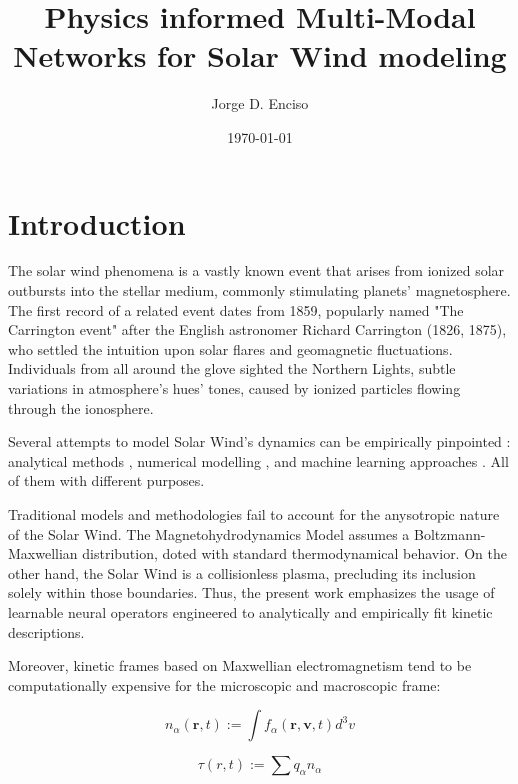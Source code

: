 \documentclass[12pt]{article}
\title{Physics informed Multi-Modal Networks for Solar Wind modeling}
\author{Jorge D. Enciso}
\date{\today}
\begin{document}
\maketitle

\begin{abstract}
\end{abstract}

\tableofcontents
\newpage

\section{Introduction}

The solar wind phenomena is a vastly known event that arises from ionized solar outbursts into the stellar medium, commonly stimulating planets' magnetosphere. \cite{Gosling2007} The first record of a related event dates from 1859, popularly named "The Carrington event" after the English astronomer Richard Carrington (1826, 1875), who settled the intuition upon solar flares and geomagnetic fluctuations. Individuals from all around the glove sighted the Northern Lights, subtle variations in atmosphere's hues' tones, caused by ionized particles flowing through the ionosphere.

Several attempts to model Solar Wind's dynamics can be empirically pinpointed : analytical methods \cite{}, numerical modelling \cite{2006LNCS.3732..554E, 10.3389/fspas.2023.1105797, windmodelling1}, and machine learning approaches \cite{comp_1, comp_2, comp_3}. All of them with different purposes.

Traditional models and methodologies fail to account for the anysotropic nature of the Solar Wind. The Magnetohydrodynamics Model assumes a Boltzmann-Maxwellian distribution, doted with standard thermodynamical behavior. On the other hand, the Solar Wind is a collisionless plasma, precluding its inclusion solely within those boundaries. Thus, the present work emphasizes the usage of learnable neural operators engineered to analytically and empirically fit kinetic descriptions.

Moreover, kinetic frames based on Maxwellian electromagnetism tend to be computationally expensive for the microscopic and macroscopic frame:

\begin{equation}
    n_{\alpha} (\mathbf{r}, t) := \int f_{\alpha}(\mathbf{r}, \mathbf{v}, t) d^3v
\end{equation}

\begin{equation}
    \tau(r, t) := \sum q_{\alpha} n_{\alpha}
\end{equation}
\end{document}
